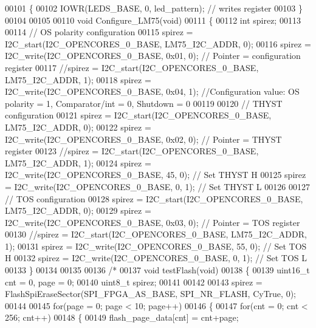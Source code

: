 \begin{DoxyCode}
00101 \{
00102     IOWR(LEDS_BASE, 0, led\_pattern);               \textcolor{comment}{// writes register}
00103 \}
00104 
00105 
00110 \textcolor{keywordtype}{void} Configure_LM75(\textcolor{keywordtype}{void})
00111 \{
00112     \textcolor{keywordtype}{int} spirez;
00113 
00114     \textcolor{comment}{// OS polarity configuration}
00115     spirez = I2C_start(I2C_OPENCORES_0_BASE, LM75_I2C_ADDR, 0);
00116     spirez = I2C_write(I2C_OPENCORES_0_BASE, 0x01, 0);              \textcolor{comment}{// Pointer = configuration register}
00117     \textcolor{comment}{//spirez = I2C\_start(I2C\_OPENCORES\_0\_BASE, LM75\_I2C\_ADDR, 1);}
00118     spirez = I2C_write(I2C_OPENCORES_0_BASE, 0x04, 1);              \textcolor{comment}{//Configuration value: OS polarity = 1,
       Comparator/int = 0, Shutdown = 0}
00119 
00120     \textcolor{comment}{// THYST configuration}
00121     spirez = I2C_start(I2C_OPENCORES_0_BASE, LM75_I2C_ADDR, 0);
00122     spirez = I2C_write(I2C_OPENCORES_0_BASE, 0x02, 0);              \textcolor{comment}{// Pointer = THYST register}
00123     \textcolor{comment}{//spirez = I2C\_start(I2C\_OPENCORES\_0\_BASE, LM75\_I2C\_ADDR, 1);}
00124     spirez = I2C_write(I2C_OPENCORES_0_BASE, 45, 0);                \textcolor{comment}{// Set THYST H}
00125     spirez = I2C_write(I2C_OPENCORES_0_BASE,  0, 1);                \textcolor{comment}{// Set THYST L}
00126 
00127     \textcolor{comment}{// TOS configuration}
00128     spirez = I2C_start(I2C_OPENCORES_0_BASE, LM75_I2C_ADDR, 0);
00129     spirez = I2C_write(I2C_OPENCORES_0_BASE, 0x03, 0);              \textcolor{comment}{// Pointer = TOS register}
00130     \textcolor{comment}{//spirez = I2C\_start(I2C\_OPENCORES\_0\_BASE, LM75\_I2C\_ADDR, 1);}
00131     spirez = I2C_write(I2C_OPENCORES_0_BASE, 55, 0);                \textcolor{comment}{// Set TOS H}
00132     spirez = I2C_write(I2C_OPENCORES_0_BASE,  0, 1);                \textcolor{comment}{// Set TOS L}
00133 \}
00134 
00135 
00136 \textcolor{comment}{/*}
00137 \textcolor{comment}{void testFlash(void)}
00138 \textcolor{comment}{\{}
00139 \textcolor{comment}{    uint16\_t cnt = 0, page = 0;}
00140 \textcolor{comment}{    uint8\_t spirez;}
00141 \textcolor{comment}{}
00142 \textcolor{comment}{}
00143 \textcolor{comment}{    spirez = FlashSpiEraseSector(SPI\_FPGA\_AS\_BASE, SPI\_NR\_FLASH, CyTrue, 0);}
00144 \textcolor{comment}{}
00145 \textcolor{comment}{    for(page = 0; page < 10; page++)}
00146 \textcolor{comment}{    \{}
00147 \textcolor{comment}{        for(cnt = 0; cnt < 256; cnt++)}
00148 \textcolor{comment}{        \{}
00149 \textcolor{comment}{            flash\_page\_data[cnt] = cnt+page;}

\end{DoxyCode}
